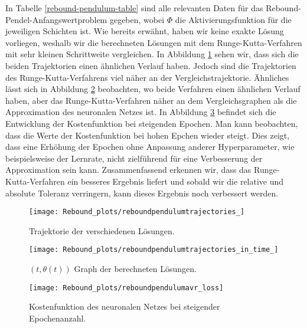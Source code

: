 In Tabelle \ref{rebound-pendulum-table} sind alle relevanten Daten für das Rebound-Pendel-Anfangswertproblem gegeben,
wobei $\Phi$ die Aktivierungsfunktion für die jeweiligen Schichten ist. Wie bereits erwähnt, haben wir keine exakte
Lösung vorliegen, weshalb wir die berechneten Lösungen mit dem Runge-Kutta-Verfahren mit sehr kleinen Schrittweite
vergleichen. In Abbildung \ref{fig:rebound-trajectories} sehen wir, dass sich die beiden Trajektorien einen ähnlichen
Verlauf haben. Jedoch sind die Trajektorien des Runge-Kutta-Verfahrens viel näher an der Vergleichstrajektorie.
Ähnliches lässt sich in Abbildung \ref{fig:rebound-trajectories-in-time} beobachten, wo beide Verfahren einen ähnlichen
Verlauf haben, aber das Runge-Kutta-Verfahren näher an dem Vergleichsgraphen als die Approximation des neuronalen Netzes
ist. In Abbildung \ref{fig:rebound-loss} befindet sich die Entwicklung der Kostenfunktion bei steigenden Epochen. Man
kann beobachten, dass die Werte der Kostenfunktion bei hohen Epchen wieder steigt. Dies zeigt, dass eine Erhöhung der
Epochen ohne Anpassung anderer Hyperparameter, wie beispielsweise der Lernrate, nicht zielführend für eine Verbesserung
der Approximation sein kann. Zusammenfassend erkennen wir, dass das Runge-Kutta-Verfahren ein besseres Ergebnis liefert
und sobald wir die relative und absolute Toleranz verringern, kann dieses Ergebnis noch verbessert werden.

\begin{figure}
       \centering
       \texttt{[image: Rebound\_plots/reboundpendulumtrajectories\_]}
       \caption{Trajektorie der verschiedenen Lösungen.}
       \label{fig:rebound-trajectories}
\end{figure}

\begin{figure}
       \centering
       \texttt{[image: Rebound\_plots/reboundpendulumtrajectories\_in\_time\_]}
       \caption{$(t, \theta(t))$ Graph der berechneten Lösungen.}
       \label{fig:rebound-trajectories-in-time}
\end{figure}


\begin{figure}
       \centering
       \texttt{[image: Rebound\_plots/reboundpendulumavr\_loss]}
       \caption{Kostenfunktion des neuronalen Netzes bei steigender Epochenanzahl.}
       \label{fig:rebound-loss}
\end{figure}

